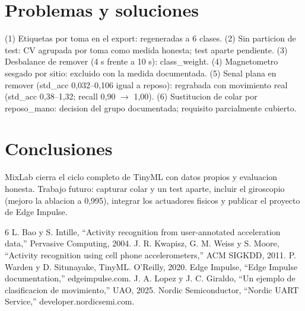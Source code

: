 \documentclass[conference]{IEEEtran}
\begin{document}
\section{Problemas y soluciones}
(1) Etiquetas por toma en el export: regeneradas a 6 clases. (2) Sin particion de test: CV agrupada por toma como medida honesta; test aparte pendiente. (3) Desbalance de remover (4 s frente a 10 s): class\_weight. (4) Magnetometro sesgado por sitio: excluido con la medida documentada. (5) Senal plana en remover (std\_acc 0,032--0,106 igual a reposo): regrabada con movimiento real (std\_acc 0,38--1,32; recall 0,90 $\rightarrow$ 1,00). (6) Sustitucion de colar por reposo\_mano: decision del grupo documentada; requisito parcialmente cubierto.

\section{Conclusiones}
MixLab cierra el ciclo completo de TinyML con datos propios y evaluacion honesta. Trabajo futuro: capturar colar y un test aparte, incluir el giroscopio (mejoro la ablacion a 0,995), integrar los actuadores fisicos y publicar el proyecto de Edge Impulse.

\begin{thebibliography}{6}
 L. Bao y S. Intille, ``Activity recognition from user-annotated acceleration data,'' Pervasive Computing, 2004.
 J. R. Kwapisz, G. M. Weiss y S. Moore, ``Activity recognition using cell phone accelerometers,'' ACM SIGKDD, 2011.
 P. Warden y D. Situnayake, TinyML. O'Reilly, 2020.
 Edge Impulse, ``Edge Impulse documentation,'' edgeimpulse.com.
 J. A. Lopez y J. C. Giraldo, ``Un ejemplo de clasificacion de movimiento,'' UAO, 2025.
 Nordic Semiconductor, ``Nordic UART Service,'' developer.nordicsemi.com.
\end{thebibliography}
\end{document}
